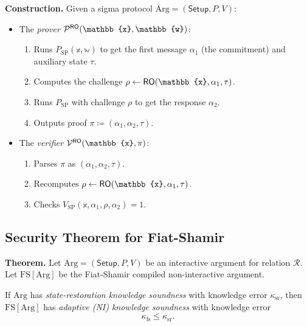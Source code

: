\documentclass[11pt]{article}
\begin{document}
\noindent\textbf{Construction.} Given a sigma protocol $\mathrm{Arg} = (\mathsf{Setup}, P, V)$:
\begin{itemize}
  \item The \emph{prover} $\prover^{\RO}(\mathbb{x}, \mathbb{w})$:
    \begin{enumerate}
      \item Runs $P_{\mathrm{SP}}(\mathbb{x}, \mathbb{w})$ to get the first message $\alpha_1$
            (the commitment) and auxiliary state $\tau$.
      \item Computes the challenge $\rho \leftarrow \RO(\mathbb{x}, \alpha_1, \tau)$.
      \item Runs $P_{\mathrm{SP}}$ with challenge $\rho$ to get the response $\alpha_2$.
      \item Outputs proof $\pi \coloneqq (\alpha_1, \alpha_2, \tau)$.
    \end{enumerate}
  \item The \emph{verifier} $\verifier^{\RO}(\mathbb{x}, \pi)$:
    \begin{enumerate}
      \item Parses $\pi$ as $(\alpha_1, \alpha_2, \tau)$.
      \item Recomputes $\rho \leftarrow \RO(\mathbb{x}, \alpha_1, \tau)$.
      \item Checks $V_{\mathrm{SP}}(\mathbb{x}, \alpha_1, \rho, \alpha_2) = 1$.
    \end{enumerate}
\end{itemize}

\subsection{Security Theorem for Fiat-Shamir}

\begin{tcolorbox}[title={Theorem: Security of Fiat-Shamir},
                  colback=yellow!10, colframe=orange!60!black, breakable]
\textbf{Theorem.}
Let $\mathrm{Arg} = (\mathsf{Setup}, P, V)$ be an interactive argument for
relation $\mathcal{R}$.  Let $\mathrm{FS}[\mathrm{Arg}]$ be the Fiat-Shamir
compiled non-interactive argument.

If $\mathrm{Arg}$ has \emph{state-restoration knowledge soundness} with
knowledge error $\kappa_{\mathrm{sr}}$, then $\mathrm{FS}[\mathrm{Arg}]$ has
\emph{adaptive (NI) knowledge soundness} with knowledge error
\[
  \kappa_{\mathrm{fs}} \le \kappa_{\mathrm{sr}}.
\]
\end{tcolorbox}
\end{document}
